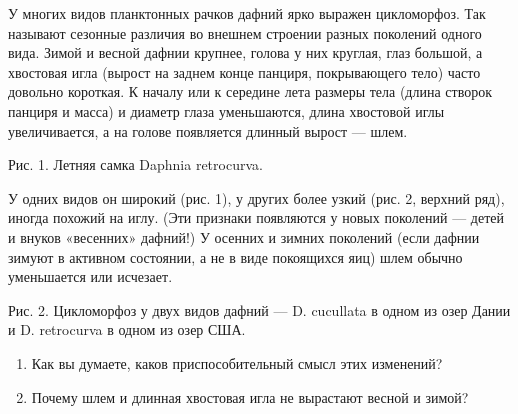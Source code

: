 
У многих видов планктонных рачков дафний ярко выражен цикломорфоз. Так называют сезонные различия во внешнем строении 
разных поколений одного вида. Зимой и весной дафнии крупнее, голова у них круглая, глаз большой, а хвостовая игла 
(вырост на заднем конце панциря, покрывающего тело) часто довольно короткая. К началу или к середине лета размеры 
тела (длина створок панциря и масса) и диаметр глаза уменьшаются, длина хвостовой иглы увеличивается, а на голове 
появляется длинный вырост — шлем. 


\begin{centering}
    Рис. 1. Летняя самка Daphnia retrocurva.
\end{centering}

У одних видов он широкий (рис. 1), у других более узкий (рис. 2, верхний ряд), 
иногда похожий на иглу. (Эти признаки появляются у новых поколений — детей и внуков «весенних» дафний!) 
У осенних и зимних поколений (если дафнии зимуют в активном состоянии, а не в виде покоящихся яиц) 
шлем обычно уменьшается или исчезает.


\begin{centering}
    Рис. 2. Цикломорфоз у двух видов дафний — D. cucullata в одном из озер Дании и D. retrocurva в одном из озер США.
\end{centering}

\begin{enumerate}
    \item Как вы думаете, каков приспособительный смысл этих изменений?
    \item Почему шлем и длинная хвостовая игла не вырастают весной и зимой?
\end{enumerate}